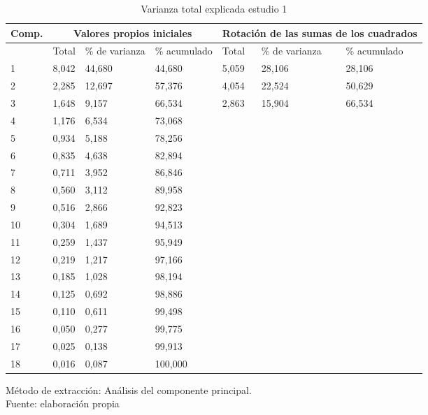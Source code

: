 \begin{table}[h]
    \caption {Varianza total explicada estudio 1}
	\label{tab:varianzaExplicada1}
	\setlength\extrarowheight{5pt}
	
	\begin{tabular}{p{1.5cm} p{1.9cm} p{1.7cm} p{1.7cm} p{1.9cm} p{1.9cm} p{1.7cm}}
	\toprule
	Comp.	& \multicolumn{3}{c}{Valores propios iniciales} & \multicolumn{3}{c}{Rotación de las sumas de los cuadrados} \\
	\midrule
		& Total	& \% de varianza	& \% acumulado	& Total	& \% de varianza 	& \% acumulado \\
	\midrule
	1  & 8,042 & 44,680 & 	44,680 & 5,059 & 28,106 & 28,106 \\
	2  & 2,285 & 12,697 & 	57,376 & 4,054 & 22,524 & 50,629 \\
	3  & 1,648 & 9,157 &	66,534 & 2,863 & 15,904 & 66,534 \\
	4  & 1,176 & 6,534 &	73,068 &  &  &  \\
	5  & 0,934 & 5,188 &	78,256 &  &  &  \\
	6  & 0,835 & 4,638 &	82,894 &  &  &  \\
	7  & 0,711 & 3,952 &	86,846 &  &  &  \\
	8  & 0,560 & 3,112 &	89,958 &  &  &  \\
	9  & 0,516 & 2,866 &	92,823 &  &  &  \\
	10 & 0,304 & 1,689 & 	94,513 &  &  &  \\
	11 & 0,259 & 1,437 & 	95,949 &  &  &  \\
	12 & 0,219 & 1,217 & 	97,166 &  &  &  \\
	13 & 0,185 & 1,028 & 	98,194 &  &  &  \\
	14 & 0,125 & 0,692 & 	98,886 &  &  &  \\
	15 & 0,110 & 0,611 & 	99,498 &  &  &  \\
	16 & 0,050 & 0,277 & 	99,775 &  &  &  \\
	17 & 0,025 & 0,138 & 	99,913 &  &  &  \\
	18 & 0,016 & 0,087 & 	100,000 &  &  &  \\
	\bottomrule
	\end{tabular}
	
	\center
	\footnotesize
	Método de extracción: Análisis del componente principal.\\
	Fuente: elaboración propia
\end{table}
